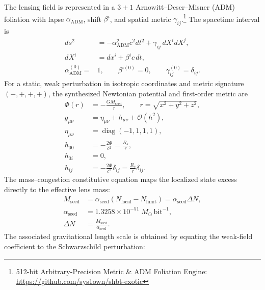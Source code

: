 \documentclass[10pt,twocolumn]{IEEEtran}
\newcommand{\Msun}{M_{\odot}}
\begin{document}
The lensing field is represented in a $3+1$ Arnowitt--Deser--Misner (ADM) foliation with lapse $\alpha_{\mathrm{ADM}}$, shift $\beta^i$, and spatial metric $\gamma_{ij}$.\footnote{512-bit Arbitrary-Precision Metric \& ADM Foliation Engine: \url{https://github.com/sys1own/shbt-exotic}} The spacetime interval is
\begin{equation}
\begin{aligned}
ds^2&=-\alpha_{\mathrm{ADM}}^2c^2dt^2
+\gamma_{ij}\,dX^i dX^j, \\
dX^i&=dx^i+\beta^i c\,dt, \\
\alpha_{\mathrm{ADM}}^{(0)}={}&1,\qquad
\beta^{i(0)}=0,\qquad
\gamma_{ij}^{(0)}=\delta_{ij}.
\end{aligned}
\label{eq:adm_line_element}
\end{equation}
For a static, weak perturbation in isotropic coordinates and metric signature $(-,+,+,+)$, the synthesized Newtonian potential and first-order metric are
\begin{equation}
\begin{aligned}
\Phi(r) &= -\frac{GM_{\mathrm{seed}}}{r},
\qquad r=\sqrt{x^2+y^2+z^2}, \\
g_{\mu\nu} &= \eta_{\mu\nu}+h_{\mu\nu}
+\mathcal O\!\left(h^2\right), \\
\eta_{\mu\nu} &= \operatorname{diag}(-1,1,1,1), \\
h_{00} &= -\frac{2\Phi}{c^2}=\frac{R_s}{r}, \\
h_{0i} &=0, \\
h_{ij} &= -\frac{2\Phi}{c^2}\delta_{ij}
=\frac{R_s}{r}\delta_{ij}.
\end{aligned}
\label{eq:linear_metric}
\end{equation}
The mass--congestion constitutive equation maps the localized state excess directly to the effective lens mass:
\begin{equation}
\begin{aligned}
M_{\mathrm{seed}} &= \alpha_{\mathrm{seed}}
\left(N_{\mathrm{local}}-N_{\mathrm{limit}}\right)
=\alpha_{\mathrm{seed}}\Delta N, \\
\alpha_{\mathrm{seed}} &=1.3258\times10^{-51}
\;\Msun\,\mathrm{bit}^{-1}, \\
\Delta N &=\frac{M_{\mathrm{seed}}}{\alpha_{\mathrm{seed}}}.
\end{aligned}
\label{eq:mass_congestion_section2}
\end{equation}
The associated gravitational length scale is obtained by equating the weak-field coefficient to the Schwarzschild perturbation:
\end{document}
